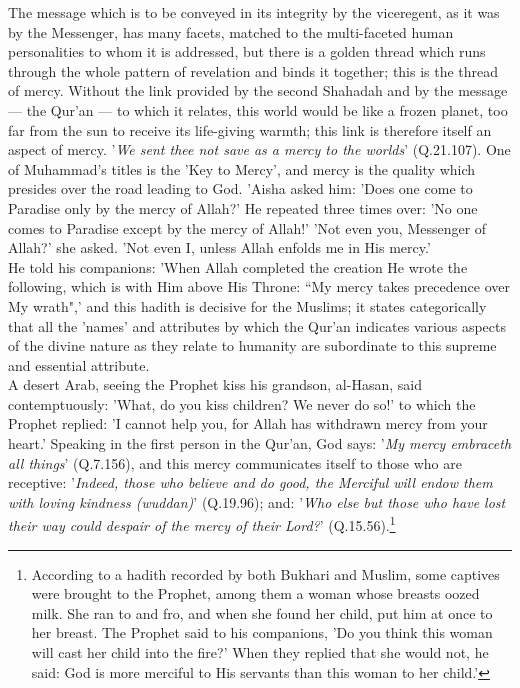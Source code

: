 \documentclass[10pt, twoside,openright]{book}
\begin{document}
The message which is to be conveyed in its integrity by the viceregent, as it was by the Messenger, 
has many facets, matched to the multi\hyp{}faceted human personalities to whom it is addressed, but there 
is a golden thread which runs through the whole pattern of revelation and binds it together; this is 
the thread of mercy. Without the link provided by the second Shahadah and by the message --- the Qur'an 
--- to which it relates, this world would be like a frozen planet, too far from the sun to receive its 
life\hyp{}giving warmth; this link is therefore itself an aspect of mercy. '\emph{We sent thee not save as a 
mercy to the worlds}' (Q.21.107). One of Muhammad's titles is the 'Key to Mercy', and mercy is the 
quality which presides over the road leading to God. 'Aisha asked him: 'Does one come to Paradise 
only by the mercy of Allah?' He repeated three times over: 'No one comes to Paradise except by the 
mercy of Allah!' 'Not even you, Messenger of Allah?' she asked. 'Not even I, unless Allah enfolds me 
in His mercy.' \\

He told his companions: 'When Allah completed the creation He wrote the following, which is with Him 
above His Throne: ``My mercy takes precedence over My wrath",' and this hadith is decisive for the 
Muslims; it states categorically that all the 'names' and attributes by which the Qur'an indicates 
various aspects of the divine nature as they relate to humanity are subordinate to this supreme and 
essential attribute. \\

A desert Arab, seeing the Prophet kiss his grandson, al\hyp{}Hasan, said contemptuously: 'What, do you 
kiss children? We never do so!' to which the Prophet replied: 'I cannot help you, for Allah has 
withdrawn mercy from your heart.' Speaking in the first person in the Qur'an, God says: '\emph{My mercy 
embraceth all things}' (Q.7.156), and this mercy communicates itself to those who are receptive: 
'\emph{Indeed, those who believe and do good, the Merciful will endow them with loving kindness (wuddan)}' (Q.19.96); and: '\emph{Who else but those who have lost their way could despair of the mercy of their Lord?}' (Q.15.56).\footnote{According to a hadith recorded by both Bukhari and Muslim, some captives were brought to the Prophet, among them a woman whose breasts oozed milk. She ran to and fro, and when she found her child, put him at once to her breast. The Prophet said to his companions, 'Do you think this woman will cast her child into the fire?' When they replied that she would not, he said: God is more merciful to His servants than this woman to her child.'}\\
\end{document}
